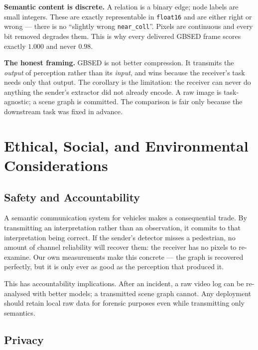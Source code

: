 \documentclass{iutbscthesis}
\begin{document}
\textbf{Semantic content is discrete.} A relation is a binary edge; node labels
are small integers. These are exactly representable in \texttt{float16} and are
either right or wrong --- there is no ``slightly wrong \texttt{near\_coll}''.
Pixels are continuous and every bit removed degrades them. This is why every
delivered GBSED frame scores exactly $1.000$ and never $0.98$.

\textbf{The honest framing.} GBSED is not better compression. It transmits the
\emph{output} of perception rather than its \emph{input}, and wins because the
receiver's task needs only that output. The corollary is the limitation: the
receiver can never do anything the sender's extractor did not already encode. A
raw image is task-agnostic; a scene graph is committed. The comparison is fair
only because the downstream task was fixed in advance.

\chapter{Ethical, Social, and Environmental Considerations} \label{chapter:ethics}

\section{Safety and Accountability}

A semantic communication system for vehicles makes a consequential trade. By
transmitting an interpretation rather than an observation, it commits to that
interpretation being correct. If the sender's detector misses a pedestrian, no
amount of channel reliability will recover them: the receiver has no pixels to
re-examine. Our own measurements make this concrete --- the graph is recovered
perfectly, but it is only ever as good as the perception that produced it.

This has accountability implications. After an incident, a raw video log can be
re-analysed with better models; a transmitted scene graph cannot. Any
deployment should retain local raw data for forensic purposes even while
transmitting only semantics.

\section{Privacy}
\end{document}
